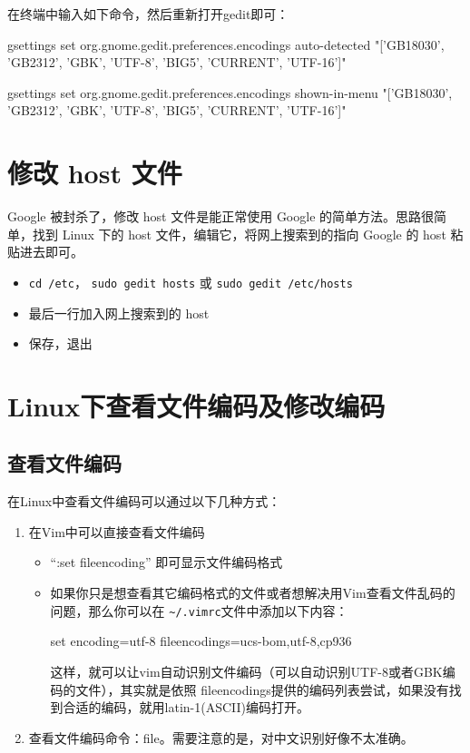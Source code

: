 {在终端中输入如下命令，然后重新打开gedit即可：

    gsettings set org.gnome.gedit.preferences.encodings auto-detected "['GB18030', 'GB2312', 'GBK', 'UTF-8', 'BIG5', 'CURRENT', 'UTF-16']"

    gsettings set org.gnome.gedit.preferences.encodings shown-in-menu "['GB18030', 'GB2312', 'GBK', 'UTF-8', 'BIG5', 'CURRENT', 'UTF-16']"



\section{修改 host 文件}
Google 被封杀了，修改 host 文件是能正常使用 Google 的简单方法。思路很简单，找到 Linux 下的 host 文件，编辑它，将网上搜索到的指向 Google 的 host 粘贴进去即可。
\begin{itemize}
\item \verb*|cd /etc|， \verb*|sudo gedit hosts| 或 \verb*|sudo gedit /etc/hosts|
\item 最后一行加入网上搜索到的 host
\item 保存，退出
\end{itemize}



\section{Linux下查看文件编码及修改编码}
\subsection{查看文件编码}
在Linux中查看文件编码可以通过以下几种方式：
\begin{enumerate}
\item 在Vim中可以直接查看文件编码
\begin{itemize}
\item ``:set fileencoding'' 即可显示文件编码格式
\item 如果你只是想查看其它编码格式的文件或者想解决用Vim查看文件乱码的问题，那么你可以在
\verb|~/.vimrc|文件中添加以下内容：

set encoding=utf-8 fileencodings=ucs-bom,utf-8,cp936

这样，就可以让vim自动识别文件编码（可以自动识别UTF-8或者GBK编码的文件），其实就是依照 fileencodings提供的编码列表尝试，如果没有找到合适的编码，就用latin-1(ASCII)编码打开。
\end{itemize}


\item 查看文件编码命令：file。需要注意的是，对中文识别好像不太准确。
\end{enumerate}



}
